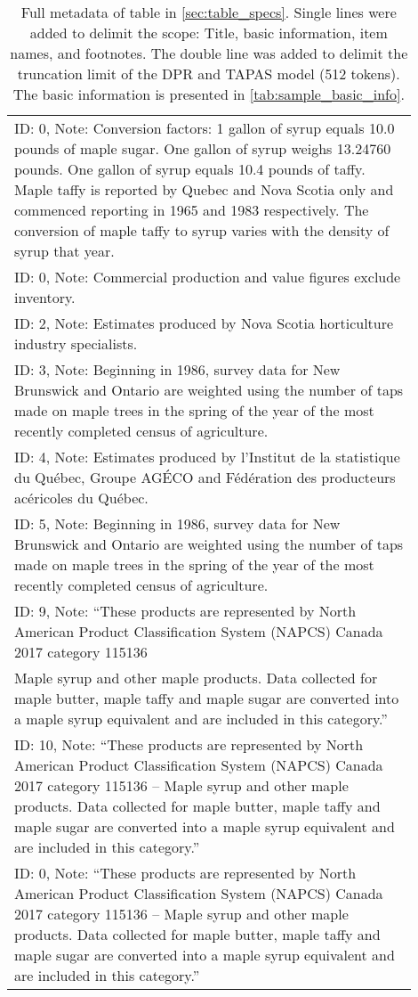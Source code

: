 \documentclass[11pt]{article}
\begin{document}
\begin{table*}[h]
\begin{tabular}{p{0.9\linewidth}}
ID: 0, Note: Conversion factors: 1 gallon of syrup equals 10.0 pounds of maple sugar. One gallon of syrup weighs 13.24760 pounds. One gallon of syrup equals 10.4 pounds of taffy. Maple taffy is reported by Quebec and Nova Scotia only and commenced reporting in 1965 and 1983 respectively. The conversion of maple taffy to syrup varies with the density of syrup that year.\\
ID: 0, Note: Commercial production and value figures exclude inventory.\\
ID: 2, Note: Estimates produced by Nova Scotia horticulture industry specialists.\\
ID: 3, Note: Beginning in 1986, survey data for New Brunswick and Ontario are weighted using the number of taps made on maple trees in the spring of the year of the most recently completed census of agriculture.\\
ID: 4, Note: Estimates produced by l'Institut de la statistique du Québec, Groupe AGÉCO and Fédération des producteurs acéricoles du Québec.\\
ID: 5, Note: Beginning in 1986, survey data for New Brunswick and Ontario are weighted using the number of taps made on maple trees in the spring of the year of the most recently completed census of agriculture.\\
ID: 9, Note: “These products are represented by North American Product Classification System (NAPCS) Canada 2017 category 115136 \\

\hline
\hline

Maple syrup and other maple products. Data collected for maple butter, maple taffy and maple sugar are converted into a maple syrup equivalent and are included in this category.”\\
ID: 10, Note: “These products are represented by North American Product Classification System (NAPCS) Canada 2017 category 115136 – Maple syrup and other maple products. Data collected for maple butter, maple taffy and maple sugar are converted into a maple syrup equivalent and are included in this category.”\\
ID: 0, Note: “These products are represented by North American Product Classification System (NAPCS) Canada 2017 category 115136 – Maple syrup and other maple products. Data collected for maple butter, maple taffy and maple sugar are converted into a maple syrup equivalent and are included in this category.”\\
\bottomrule
    \end{tabular}
    \caption{Full metadata of table in \autoref{sec:table_specs}. Single lines were added to delimit the scope: Title, basic information, item names, and footnotes. The double line was added to delimit the truncation limit of the DPR and TAPAS model (512 tokens). The basic information is presented in \autoref{tab:sample_basic_info}.}
    \label{tab:sample_full_info}
\end{table*}
\end{document}
